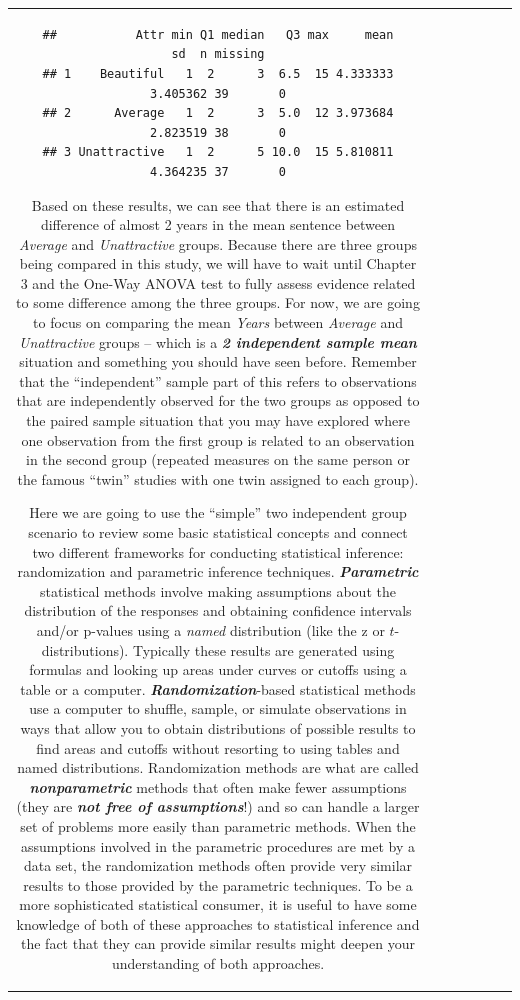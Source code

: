\documentclass[]{book}
\theoremstyle{definition}
\theoremstyle{definition}
\theoremstyle{remark}
\begin{document}
\begin{longtable}[]{@{}ccccccc@{}}
\begin{minipage}[b]{0.10\columnwidth}
\begin{verbatim}
##           Attr min Q1 median   Q3 max     mean       sd  n missing
## 1    Beautiful   1  2      3  6.5  15 4.333333 3.405362 39       0
## 2      Average   1  2      3  5.0  12 3.973684 2.823519 38       0
## 3 Unattractive   1  2      5 10.0  15 5.810811 4.364235 37       0
\end{verbatim}

Based on these results, we can see that there is an estimated difference
of almost 2 years in the mean sentence between \emph{Average} and
\emph{Unattractive} groups. Because there are three groups being
compared in this study, we will have to wait until Chapter 3 and the
One-Way ANOVA test to fully assess evidence related to some difference
among the three groups. For now, we are going to focus on comparing the
mean \emph{Years} between \emph{Average} and \emph{Unattractive} groups
-- which is a \textbf{\emph{2 independent sample mean}} situation and
something you should have seen before. Remember that the ``independent''
sample part of this refers to observations that are independently
observed for the two groups as opposed to the paired sample situation
that you may have explored where one observation from the first group is
related to an observation in the second group (repeated measures on the
same person or the famous ``twin'' studies with one twin assigned to
each group).

Here we are going to use the ``simple'' two independent group scenario
to review some basic statistical concepts and connect two different
frameworks for conducting statistical inference: randomization and
parametric inference techniques. \textbf{\emph{Parametric}} statistical
methods involve making assumptions about the distribution of the
responses and obtaining confidence intervals and/or p-values using a
\emph{named} distribution (like the z or \(t\)-distributions). Typically
these results are generated using formulas and looking up areas under
curves or cutoffs using a table or a computer.
\textbf{\emph{Randomization}}-based statistical methods use a computer
to shuffle, sample, or simulate observations in ways that allow you to
obtain distributions of possible results to find areas and cutoffs
without resorting to using tables and named distributions. Randomization
methods are what are called \textbf{\emph{nonparametric}} methods that
often make fewer assumptions (they are \textbf{\emph{not free of
assumptions}}!) and so can handle a larger set of problems more easily
than parametric methods. When the assumptions involved in the parametric
procedures are met by a data set, the randomization methods often
provide very similar results to those provided by the parametric
techniques. To be a more sophisticated statistical consumer, it is
useful to have some knowledge of both of these approaches to statistical
inference and the fact that they can provide similar results might
deepen your understanding of both approaches.


\end{minipage}
\end{longtable}
\end{document}
